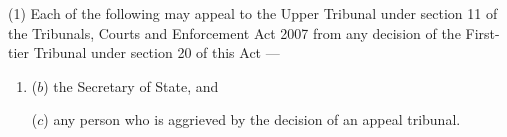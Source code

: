\documentclass[12pt,a4paper]{article}
\begin{document}

(1) Each of the following may appeal 
to the Upper Tribunal under section 11 of the Tribunals, Courts and Enforcement Act 2007 from any decision of the First-tier Tribunal under section 20 of this Act%
—
\begin{enumerate}\item[]

($b$) the Secretary of State, and

($c$) any person who is aggrieved by the decision of an appeal tribunal.
\end{enumerate}

\end{document}
